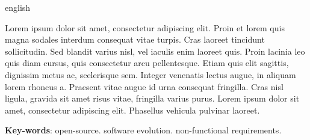 \begin{resumo}[Abstract]
  \begin{otherlanguage*}{english} 
  
  Lorem ipsum dolor sit amet, consectetur adipiscing elit. Proin et lorem quis magna sodales interdum consequat vitae turpis. Cras laoreet tincidunt sollicitudin. Sed blandit varius nisl, vel iaculis enim laoreet quis. Proin lacinia leo quis diam cursus, quis consectetur arcu pellentesque. Etiam quis elit sagittis, dignissim metus ac, scelerisque sem. Integer venenatis lectus augue, in aliquam lorem rhoncus a. Praesent vitae augue id urna consequat fringilla. Cras nisl ligula, gravida sit amet risus vitae, fringilla varius purus. Lorem ipsum dolor sit amet, consectetur adipiscing elit. Phasellus vehicula pulvinar laoreet. 
  
  \vspace{\onelineskip}
 
  \noindent 
  \textbf{Key-words}: open-source. software evolution. non-functional requirements.
  \end{otherlanguage*}
\end{resumo}


